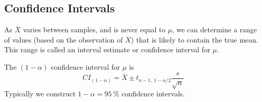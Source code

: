 \documentclass{article}
\begin{document}
\subsection{Confidence Intervals}
\begin{definition}
    As \(\overline{X}\) varies between samples, and is never equal to \(\mu\), we can determine
    a range of values (based on the observation of \(\overline{X}\)) that is likely to contain
    the true mean. This range is called an interval estimate or confidence interval for \(\mu \).

    The \(\left( 1 - \alpha \right)\) confidence interval for \(\mu \) is
    \begin{equation*}
        {CI}_{\left( 1 - \alpha \right)} = \overline{X} \pm t_{n-1,\: 1-\alpha/2} \frac{s}{\sqrt{n}}
    \end{equation*}
    Typically we construct \(1-\alpha = \SI{95}{\percent}\) confidence intervals.
\end{definition}
\end{document}
